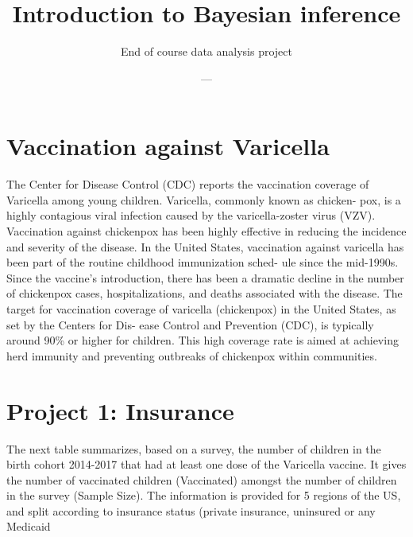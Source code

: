 \documentclass[
  letterpaper,
  DIV=11,
  numbers=noendperiod]{scrartcl}
\title{Introduction to Bayesian inference}
\subtitle{End of course data analysis project}
\author{---}
\date{}
\begin{document}
\maketitle


\section{Vaccination against
Varicella}\label{vaccination-against-varicella}

The Center for Disease Control (CDC) reports the vaccination coverage of
Varicella among young children. Varicella, commonly known as chicken-
pox, is a highly contagious viral infection caused by the
varicella-zoster virus (VZV). Vaccination against chickenpox has been
highly effective in reducing the incidence and severity of the disease.
In the United States, vaccination against varicella has been part of the
routine childhood immunization sched- ule since the mid-1990s. Since the
vaccine's introduction, there has been a dramatic decline in the number
of chickenpox cases, hospitalizations, and deaths associated with the
disease. The target for vaccination coverage of varicella (chickenpox)
in the United States, as set by the Centers for Dis- ease Control and
Prevention (CDC), is typically around 90\% or higher for children. This
high coverage rate is aimed at achieving herd immunity and preventing
outbreaks of chickenpox within communities.

\section{Project 1: Insurance}\label{project-1-insurance}

The next table summarizes, based on a survey, the number of children in
the birth cohort 2014-2017 that had at least one dose of the Varicella
vaccine. It gives the number of vaccinated children (Vaccinated) amongst
the number of children in the survey (Sample Size). The information is
provided for 5 regions of the US, and split according to insurance
status (private insurance, uninsured or any Medicaid
\end{document}
